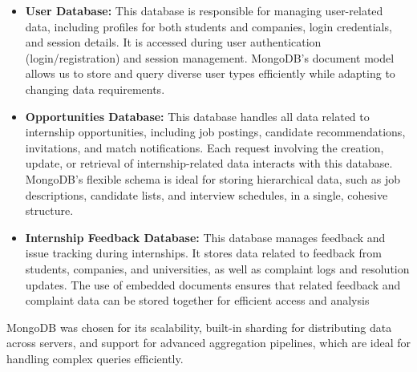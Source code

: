 \begin{itemize}
    \item \textbf{User Database:} This database is responsible for managing user-related data, including profiles for both students and companies, login credentials, and session details. It is accessed during user authentication (login/registration) and session management. MongoDB’s document model allows us to store and query diverse user types efficiently while adapting to changing data requirements.
    \item \textbf{Opportunities Database:} This database handles all data related to internship opportunities, including job postings, candidate recommendations, invitations, and match notifications. Each request involving the creation, update, or retrieval of internship-related data interacts with this database. MongoDB’s flexible schema is ideal for storing hierarchical data, such as job descriptions, candidate lists, and interview schedules, in a single, cohesive structure.
    \item \textbf{Internship Feedback Database:} This database manages feedback and issue tracking during internships. It stores data related to feedback from students, companies, and universities, as well as complaint logs and resolution updates. The use of embedded documents ensures that related feedback and complaint data can be stored together for efficient access and analysis
\end{itemize}

MongoDB was chosen for its scalability, built-in sharding for distributing data across servers, and support for advanced aggregation pipelines, which are ideal for handling complex queries efficiently. 